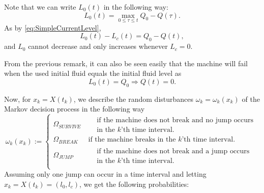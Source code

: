\begin{remark}
	Note that we can write $L_0(t)$ in the following way:
	\[
	L_0(t)=\max\limits_{0\leq\tau\leq t} Q_0-Q(\tau).
	\]
	As by \eqref{eq:SimpleCurrentLevel}, 
	\[
	L_0(t)-L_c(t)=Q_0-Q(t),
	\]
	and $L_0$ cannot decrease and only increases whenever $L_c=0$.
\end{remark}
\begin{corollary}
	From the previous remark, it can also be seen easily that the machine will fail when the used initial fluid equals the initial fluid level as
	\[
	L_0(t)=Q_0\Rightarrow Q(t)=0.
	\]
\end{corollary}

Now, for $x_k=X(t_k)$, we describe the random disturbances $\omega_k=\omega_k(x_k)$ of the Markov decision process in the following way
\[
\omega_k(x_k):=\begin{cases}
\Omega_{SURVIVE}&\ \begin{split}&\text{if the machine does not break and no jump occurs}\\
&\text{in the $k$'th time interval.}\end{split}\\
\Omega_{BREAK}&\ \text{if the machine breaks in the $k$'th time interval.}\\
\Omega_{JUMP}&\ \begin{split}&\text{if the machine does not break and a jump occurs}\\
&\text{in the $k$'th time interval.}\end{split}\\
\end{cases}
\]
Assuming only one jump can occur in a time interval and letting $x_k=X(t_k)=(l_0,l_c)$, we get the following probabilities:
